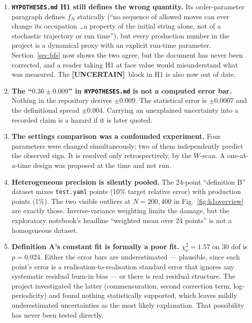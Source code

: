 \documentclass[11pt,a4paper]{article}
\newcommand{\Unc}{\textcolor{conj}{\textbf{[UNCERTAIN]}}}
\begin{document}
\begin{enumerate}
\item \textbf{\texttt{HYPOTHESES.md} H1 still defines the wrong
quantity.} Its order-parameter paragraph defines $f_N$ statically
(``no sequence of allowed moves can ever change its occupation \dots a
property of the initial string alone, not of a stochastic trajectory or run
time''), but every production number in the project is a dynamical proxy
with an explicit run-time parameter. Section~\ref{sec:bfs} now shows the two
agree, but the document has never been corrected, and a reader taking H1 at
face value would misunderstand what was measured. The \Unc\ block in H1 is
also now out of date.

\item \textbf{The ``$0.36\pm0.009$'' in \texttt{HYPOTHESES.md} is not a
computed error bar.} Nothing in the repository derives $\pm0.009$. The
statistical error is $\pm0.0007$ and the definitional spread $\pm0.004$.
Carrying an unexplained uncertainty into a recorded claim is a hazard if it
is later quoted.

\item \textbf{The settings comparison was a confounded experiment.} Four
parameters were changed simultaneously; two of them independently predict
the observed sign. It is resolved only retrospectively, by the $W$-scan.
A one-at-a-time design was proposed at the time and not run.

\item \textbf{Heterogeneous precision is silently pooled.} The 24-point
``definition B'' dataset mixes \texttt{test.yaml} points (10\% target
relative error) with production points (1\%). The two visible outliers at
$N=200,400$ in Fig.~\ref{fig:h1overview} are exactly those. Inverse-variance
weighting limits the damage, but the exploratory notebook's headline
``weighted mean over 24 points'' is not a homogeneous dataset.

\item \textbf{Definition A's constant fit is formally a poor fit.}
$\chi^2_\nu=1.57$ on 30 dof is $p=0.024$. Either the error bars are
underestimated --- plausible, since each point's error is a
realisation-to-realisation standard error that ignores any systematic
residual burn-in bias --- or there is real residual structure. The project
investigated the latter (commensuration, second correction term,
log-periodicity) and found nothing statistically supported, which leaves
mildly underestimated uncertainties as the most likely explanation. That
possibility has never been tested directly.


\end{enumerate}
\end{document}
